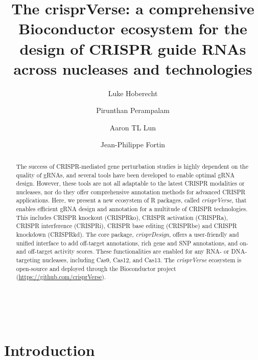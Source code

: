 \documentclass[pdftex,english,10pt]{article}
\begin{document}
\renewcommand\Affilfont{\small}


\title{The crisprVerse: a comprehensive Bioconductor ecosystem for the design of CRISPR guide RNAs across nucleases and technologies}
\author[1]{Luke Hoberecht}
\author[2]{Pirunthan Perampalam}
\author[1]{Aaron TL Lun}
\author[1,*]{Jean-Philippe Fortin}
\date{}






\maketitle
\
\begin{abstract}
\noindent 
The success of CRISPR-mediated gene perturbation studies is highly dependent on the quality of gRNAs, and several tools have been developed to enable optimal gRNA design. 
However, these tools are not all adaptable to the latest CRISPR modalities or nucleases, nor do they offer comprehensive annotation methods for advanced CRISPR applications.
Here, we present a new ecosystem of R packages, called \textit{crisprVerse}, that enables efficient gRNA design and annotation for a multitude of CRISPR technologies. This includes CRISPR knockout (CRISPRko), CRISPR activation (CRISPRa), CRISPR interference (CRISPRi), CRISPR base editing (CRISPRbe) and CRISPR knockdown (CRISPRkd). 
The core package, \textit{crisprDesign}, offers a user-friendly and unified interface to add off-target annotations, rich gene and SNP annotations, and on- and off-target activity scores. These functionalities are enabled for any RNA- or DNA-targeting nucleases, including Cas9, Cas12, and Cas13. 
The \textit{crisprVerse} ecosystem is open-source and deployed through the Bioconductor project (\url{https://github.com/crisprVerse}).
 \end{abstract}




\section*{Introduction}
\end{document}
